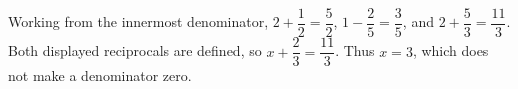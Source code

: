 Working from the innermost denominator, $2+\dfrac{1}{2}=\dfrac{5}{2}$, $1-\dfrac{2}{5}=\dfrac{3}{5}$, and $2+\dfrac{5}{3}=\dfrac{11}{3}$. Both displayed reciprocals are defined, so $x+\dfrac{2}{3}=\dfrac{11}{3}$. Thus $\boxed{x=3}$, which does not make a denominator zero.
